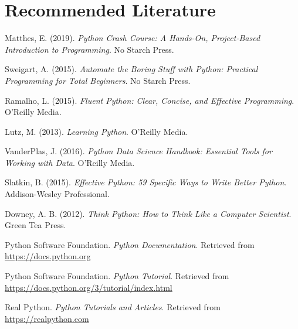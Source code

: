 \documentclass[12pt]{book}
\begin{document}
\chapter*{Recommended Literature}

\begin{thebibliography}{9}

 Matthes, E. (2019). \textit{Python Crash Course: A Hands-On, Project-Based Introduction to Programming}. No Starch Press.

 Sweigart, A. (2015). \textit{Automate the Boring Stuff with Python: Practical Programming for Total Beginners}. No Starch Press.

 Ramalho, L. (2015). \textit{Fluent Python: Clear, Concise, and Effective Programming}. O'Reilly Media.

 Lutz, M. (2013). \textit{Learning Python}. O'Reilly Media.

 VanderPlas, J. (2016). \textit{Python Data Science Handbook: Essential Tools for Working with Data}. O'Reilly Media.

 Slatkin, B. (2015). \textit{Effective Python: 59 Specific Ways to Write Better Python}. Addison-Wesley Professional.

 Downey, A. B. (2012). \textit{Think Python: How to Think Like a Computer Scientist}. Green Tea Press.

 Python Software Foundation. \textit{Python Documentation}. Retrieved from \url{https://docs.python.org}

 Python Software Foundation. \textit{Python Tutorial}. Retrieved from \url{https://docs.python.org/3/tutorial/index.html}

 Real Python. \textit{Python Tutorials and Articles}. Retrieved from \url{https://realpython.com}

\end{thebibliography}

\newpage
\printbibliography
\end{document}
